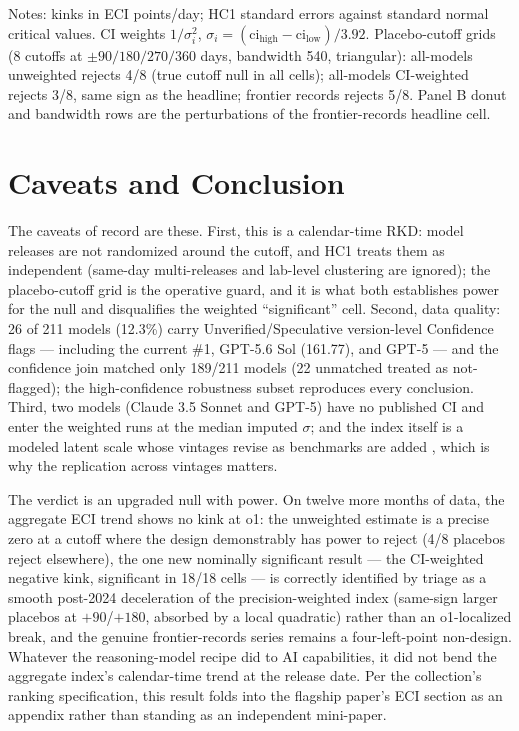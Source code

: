\documentclass[11pt]{article}
\begin{document}
\begin{table}[t]
\medskip
\parbox{0.95\textwidth}{\footnotesize Notes: kinks in ECI points/day; HC1
standard errors against standard normal critical values. CI weights
$1/\sigma_i^2$, $\sigma_i = (\mathrm{ci}_{\mathrm{high}} -
\mathrm{ci}_{\mathrm{low}})/3.92$. Placebo-cutoff grids (8 cutoffs at
$\pm90/180/270/360$ days, bandwidth 540, triangular): all-models unweighted
rejects 4/8 (true cutoff null in all cells); all-models CI-weighted rejects
3/8, same sign as the headline; frontier records rejects 5/8. Panel B donut
and bandwidth rows are the perturbations of the frontier-records headline
cell.}
\end{table}

\section{Caveats and Conclusion}\label{sec:conclusion}

The caveats of record are these. First, this is a calendar-time RKD: model
releases are not randomized around the cutoff, and HC1 treats them as
independent (same-day multi-releases and lab-level clustering are ignored);
the placebo-cutoff grid is the operative guard, and it is what both
establishes power for the null and disqualifies the weighted ``significant''
cell. Second, data quality: 26 of 211 models (12.3\%) carry
Unverified/Speculative version-level Confidence flags --- including the
current \#1, GPT-5.6 Sol (161.77), and GPT-5 --- and the confidence join
matched only 189/211 models (22 unmatched treated as not-flagged); the
high-confidence robustness subset reproduces every conclusion. Third, two
models (Claude 3.5 Sonnet and GPT-5) have no published CI and enter the
weighted runs at the median imputed $\sigma$; and the index itself is a
modeled latent scale whose vintages revise as benchmarks are added
\cite{ho2025}, which is why the replication across vintages matters.

The verdict is an upgraded null with power. On twelve more months of data,
the aggregate ECI trend shows no kink at o1: the unweighted estimate is a
precise zero at a cutoff where the design demonstrably has power to reject
(4/8 placebos reject elsewhere), the one new nominally significant result ---
the CI-weighted negative kink, significant in 18/18 cells --- is correctly
identified by triage as a smooth post-2024 deceleration of the
precision-weighted index (same-sign larger placebos at $+90$/$+180$,
absorbed by a local quadratic) rather than an o1-localized break, and the
genuine frontier-records series remains a four-left-point non-design.
Whatever the reasoning-model recipe did to AI capabilities, it did not bend
the aggregate index's calendar-time trend at the release date. Per the
collection's ranking specification, this result folds into the flagship
paper's ECI section as an appendix rather than standing as an independent
mini-paper.
\end{document}
